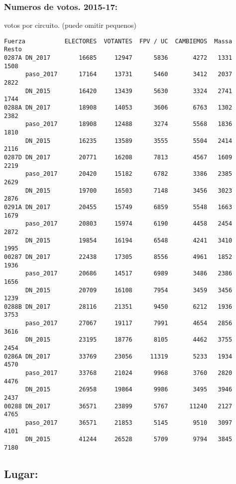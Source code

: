 \documentclass[11pt]{article}
\begin{document}
    \hypertarget{numeros-de-votos.-2015-17}{%
\subsubsection{Numeros de votos.
2015-17:}\label{numeros-de-votos.-2015-17}}

    
    votos por circuito. (puede omitir pequenos)

    
    
    \begin{verbatim}
Fuerza           ELECTORES  VOTANTES  FPV / UC  CAMBIEMOS  Massa  Resto
0287A DN_2017        16685     12947      5836       4272   1331   1508
      paso_2017      17164     13731      5460       3412   2037   2822
      DN_2015        16420     13439      5630       3324   2741   1744
0288A DN_2017        18908     14053      3606       6763   1302   2382
      paso_2017      18908     12488      3274       5568   1836   1810
      DN_2015        16235     13589      3555       5504   2414   2116
0287D DN_2017        20771     16208      7813       4567   1609   2219
      paso_2017      20420     15182      6782       3386   2385   2629
      DN_2015        19700     16503      7148       3456   3023   2876
0291A DN_2017        20455     15749      6859       5548   1663   1679
      paso_2017      20803     15974      6190       4458   2454   2872
      DN_2015        19854     16194      6548       4241   3410   1995
00287 DN_2017        22438     17305      8556       4961   1852   1936
      paso_2017      20686     14517      6989       3486   2386   1656
      DN_2015        20709     16108      7954       3459   3456   1239
0288B DN_2017        28116     21351      9450       6212   1936   3753
      paso_2017      27067     19117      7991       4654   2856   3616
      DN_2015        23195     18776      8105       4462   3755   2454
0286A DN_2017        33769     23056     11319       5233   1934   4570
      paso_2017      33768     21024      9968       3760   2820   4476
      DN_2015        26958     19864      9986       3495   3946   2437
00288 DN_2017        36571     23899      5767      11240   2127   4765
      paso_2017      36571     21853      5145       9510   3097   4101
      DN_2015        41244     26528      5709       9794   3845   7180
    \end{verbatim}

    
    \hypertarget{lugar}{%
\subsection{Lugar:}\label{lugar}}
\end{document}
